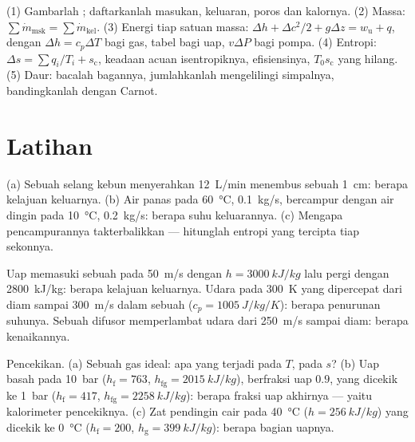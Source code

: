 \begin{method}\label{meth:b2:open-systems:method}
(1) Gambarlah ; daftarkanlah masukan, keluaran, poros dan kalornya.
(2) Massa: $\sum\dot m_{\text{msk}} = \sum\dot m_{\text{kel}}$. (3) Energi
tiap satuan massa: $\Delta h + \Delta c^2/2 + g\Delta z = w_{\text{u}} + q$, dengan
$\Delta h = c_p\Delta T$ bagi gas, tabel bagi uap, $v\Delta P$ bagi
pompa. (4) Entropi: $\Delta s = \sum q_i/T_i + s_{\text{c}}$, keadaan acuan
isentropiknya, efisiensinya, $T_0s_{\text{c}}$ yang hilang. (5) Daur: bacalah
bagannya, jumlahkanlah mengelilingi simpalnya, bandingkanlah dengan Carnot.
\end{method}

\section{Latihan}

\begin{exercise}[$\star$]\label{exo:b2:open-systems:1}
(a) Sebuah selang kebun menyerahkan \qty{12}{L/min} menembus sebuah 
\qty{1}{cm}: berapa kelajuan keluarnya. (b) Air panas pada \qty{60}{\celsius}, \qty{0.1}{kg/s},
bercampur dengan air dingin pada \qty{10}{\celsius}, \qty{0.2}{kg/s}: berapa suhu
keluarannya. (c) Mengapa pencampurannya takterbalikkan --- hitunglah
entropi yang tercipta tiap sekonnya.
\end{exercise}

\begin{exercise}[$\star$]\label{exo:b2:open-systems:2}
Uap memasuki sebuah  pada \qty{50}{m/s} dengan $h = \qty{3000}{kJ/kg}$ lalu
pergi dengan \qty{2800}{kJ/kg}: berapa kelajuan keluarnya. Udara pada \qty{300}{K} yang dipercepat
dari diam sampai \qty{300}{m/s} dalam sebuah  ($c_p = \qty{1005}{J/kg/K}$):
berapa penurunan suhunya. Sebuah difusor memperlambat udara dari \qty{250}{m/s} sampai diam: berapa kenaikannya.
\end{exercise}

\begin{exercise}[$\star$]\label{exo:b2:open-systems:3}
Pencekikan. (a) Sebuah gas ideal: apa yang terjadi pada $T$, pada $s$? (b) Uap basah
pada \qty{10}{bar} ($h_{\text{f}} = 763$, $h_{\text{fg}} = \qty{2015}{kJ/kg}$),
berfraksi uap $0.9$, yang dicekik ke \qty{1}{bar} ($h_{\text{f}} = 417$, $h_{\text{fg}}
= \qty{2258}{kJ/kg}$): berapa fraksi uap akhirnya --- yaitu kalorimeter pencekiknya. (c)
Zat pendingin cair pada \qty{40}{\celsius} ($h = \qty{256}{kJ/kg}$) yang dicekik
ke \qty{0}{\celsius} ($h_{\text{f}} = 200$, $h_{\text{g}} = \qty{399}{kJ/kg}$):
berapa bagian uapnya.
\end{exercise}

